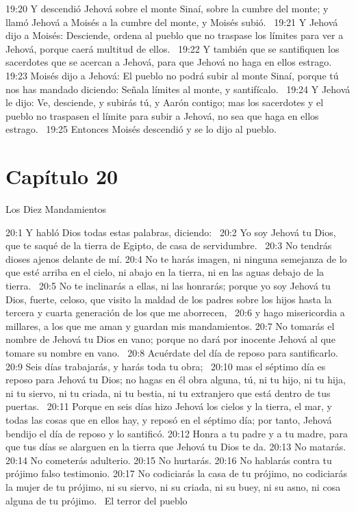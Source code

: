 19:20 Y descendió Jehová sobre el monte Sinaí, sobre la cumbre del monte; y llamó Jehová a Moisés a la cumbre del monte, y Moisés subió.  
19:21 Y Jehová dijo a Moisés: Desciende, ordena al pueblo que no traspase los límites para ver a Jehová, porque caerá multitud de ellos.  
19:22 Y también que se santifiquen los sacerdotes que se acercan a Jehová, para que Jehová no haga en ellos estrago.  
19:23 Moisés dijo a Jehová: El pueblo no podrá subir al monte Sinaí, porque tú nos has mandado diciendo: Señala límites al monte, y santifícalo.  
19:24 Y Jehová le dijo: Ve, desciende, y subirás tú, y Aarón contigo; mas los sacerdotes y el pueblo no traspasen el límite para subir a Jehová, no sea que haga en ellos estrago.  
19:25 Entonces Moisés descendió y se lo dijo al pueblo. 
\section*{Capítulo 20 }
Los Diez Mandamientos  


20:1 Y habló Dios todas estas palabras, diciendo:  
20:2 Yo soy Jehová tu Dios, que te saqué de la tierra de Egipto, de casa de servidumbre.  
20:3 No tendrás dioses ajenos delante de mí. 
20:4 No te harás imagen, ni ninguna semejanza de lo que esté arriba en el cielo, ni abajo en la tierra, ni en las aguas debajo de la tierra.  
20:5 No te inclinarás a ellas, ni las honrarás; porque yo soy Jehová tu Dios, fuerte, celoso, que visito la maldad de los padres sobre los hijos hasta la tercera y cuarta generación de los que me aborrecen,  
20:6 y hago misericordia a millares, a los que me aman y guardan mis mandamientos. 
20:7 No tomarás el nombre de Jehová tu Dios en vano; porque no dará por inocente Jehová al que tomare su nombre en vano.  
20:8 Acuérdate del día de reposo para santificarlo. 
20:9 Seis días trabajarás, y harás toda tu obra;  
20:10 mas el séptimo día es reposo para Jehová tu Dios; no hagas en él obra alguna, tú, ni tu hijo, ni tu hija, ni tu siervo, ni tu criada, ni tu bestia, ni tu extranjero que está dentro de tus puertas.  
20:11 Porque en seis días hizo Jehová los cielos y la tierra, el mar, y todas las cosas que en ellos hay, y reposó en el séptimo día; por tanto, Jehová bendijo el día de reposo y lo santificó. 
20:12 Honra a tu padre y a tu madre, para que tus días se alarguen en la tierra que Jehová tu Dios te da. 
20:13 No matarás. 
20:14 No cometerás adulterio. 
20:15 No hurtarás. 
20:16 No hablarás contra tu prójimo falso testimonio. 
20:17 No codiciarás la casa de tu prójimo, no codiciarás la mujer de tu prójimo, ni su siervo, ni su criada, ni su buey, ni su asno, ni cosa alguna de tu prójimo.  
El terror del pueblo  


